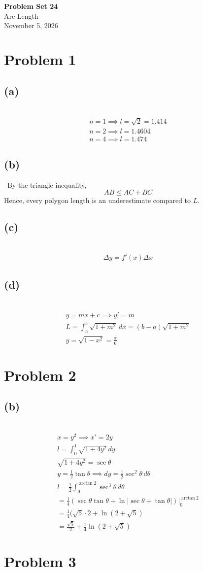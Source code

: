 \documentclass[12pt]{article}
\newcommand{\at}{\Big|}
\newcommand{\vem}{\vspace{0.5em}}
\newcommand{\problem}[1]{\section{Problem #1}}
\newcommand{\subproblem}[1]{\subsection{(#1)} \,}
\begin{document}
\vspace*{0cm}

\begin{center}
    {\Large \bfseries Problem Set 24} \\[0.5cm]
    {\large Arc Length} \\[0.35cm]
    {\normalsize November 5, 2026}
\end{center}


\problem{1}

\subproblem{a}
\begin{gather*}
    n=1 \implies l=\sqrt{2}= 1.414\\
    n=2 \implies l = 1.4604\\
    n=4 \implies l =1.474
\end{gather*}

\subproblem{b}
By the triangle inequality,
\[
AB \le AC+BC
\]
Hence, every polygon length is an underestimate compared to $L$.\vem

\subproblem{c}
\begin{gather*}
    \Delta y=f'(x)\Delta x
\end{gather*}

\subproblem{d}
\begin{gather*}
    y=mx+c\implies y'=m\\
    L=\int_a^b\sqrt{1+m^2}\, dx = (b-a)\sqrt{1+m^2}\\
    y=\sqrt{1-x^2}= \boxed{\frac{\pi}{6}}
\end{gather*}

\problem{2}

\subproblem{b}
\begin{gather*}
    x =y^2\implies x'=2y\\
    l=\int_0^1 \sqrt{1+4y^2}\, dy\\
    \sqrt{1+4y^2} = \sec \theta\\
    y= \frac{1}{2}\tan \theta  \implies dy= \frac{1}{2}\sec^2 \theta \, d\theta\\
    l= \frac{1}{2}\int_0^{\arctan 2} \sec^3 \theta \, d\theta\\
    = \frac{1}{4}(\sec \theta \tan \theta + \ln | \sec \theta + \tan \theta|) \at_0^{\arctan 2}\\
    = \frac{1}{4}(\sqrt{5} \cdot 2 + \ln (2+\sqrt{5})\\
    = \boxed{\frac{\sqrt{5}}{2} + \frac{1}{4} \ln (2+\sqrt{5})}
\end{gather*}

\problem{3}
\end{document}
